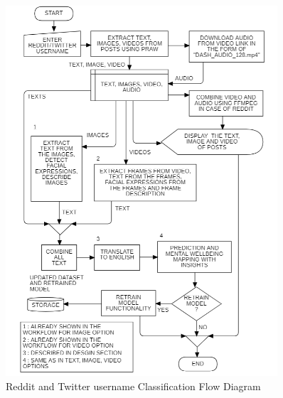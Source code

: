 \pagebreak
\begin{figure}[h!]  
    \centering
    \includegraphics[width=0.9\textwidth]{Images/APP REDDIT.png}  
    \caption*{Reddit and Twitter username Classification Flow Diagram}
    \label{01234i}  %
\end{figure}


\pagebreak






\pagebreak


